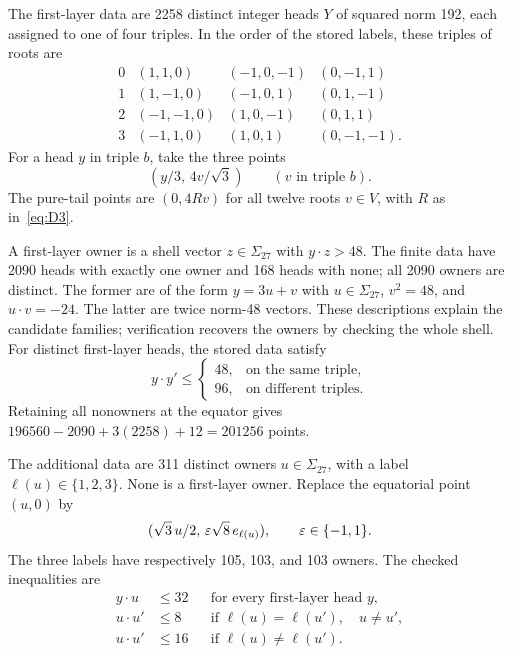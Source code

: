 The first-layer data are 2258 distinct integer heads $Y$ of squared
norm 192, each assigned to one of four triples. In the order of the
stored labels, these triples of roots are
\[
\begin{array}{c|rrr}
0&(1,1,0)&(-1,0,-1)&(0,-1,1)\\
1&(1,-1,0)&(-1,0,1)&(0,1,-1)\\
2&(-1,-1,0)&(1,0,-1)&(0,1,1)\\
3&(-1,1,0)&(1,0,1)&(0,-1,-1).
\end{array}
\]
For a head $y$ in triple $b$, take the three points
\begin{equation}\label{eq:d27-first}
 (y/3,\,4v/\sqrt3)\qquad(v\text{ in triple }b).
\end{equation}
The pure-tail points are $(0,4Rv)$ for all twelve roots
$v\in V$, with $R$ as in~\eqref{eq:D3}.

A first-layer owner is a shell vector $z\in\Sigma_{27}$ with $y\cdot z>48$.
The finite data have 2090 heads with exactly one owner and 168
heads with none; all 2090 owners are distinct. The former are
of the form $y=3u+v$ with $u\in\Sigma_{27}$, $v^2=48$, and
$u\cdot v=-24$. The latter are twice norm-48 vectors. These
descriptions explain the candidate families; verification recovers
the owners by checking the whole shell.
For distinct first-layer heads, the stored data satisfy
\begin{equation}\label{eq:d27-first-threshold}
 y\cdot y'\le
 \begin{cases}
 48,&\text{on the same triple},\\
 96,&\text{on different triples}.
 \end{cases}
\end{equation}
Retaining all nonowners at the equator gives
$196560-2090+3(2258)+12=201256$ points.

The additional data are 311 distinct owners $u\in\Sigma_{27}$, with a
label $\ell(u)\in\{1,2,3\}$. None is a first-layer owner. Replace
the equatorial point $(u,0)$ by
\begin{equation}\label{eq:d27-second}
 (\sqrt3\,u/2,\,\varepsilon\sqrt8\,e_{\ell(u)}),
 \qquad \varepsilon\in\{-1,1\}.
\end{equation}
The three labels have respectively 105, 103, and 103 owners.
The checked inequalities are
\begin{align}
 y\cdot u&\le32&&\text{for every first-layer head }y,\label{eq:d27-interlayer}\\
 u\cdot u'&\le8&&\text{if }\ell(u)=\ell(u'),\quad u\ne u',\label{eq:d27-sameline}\\
 u\cdot u'&\le16&&\text{if }\ell(u)\ne\ell(u').\label{eq:d27-crossline}
\end{align}

